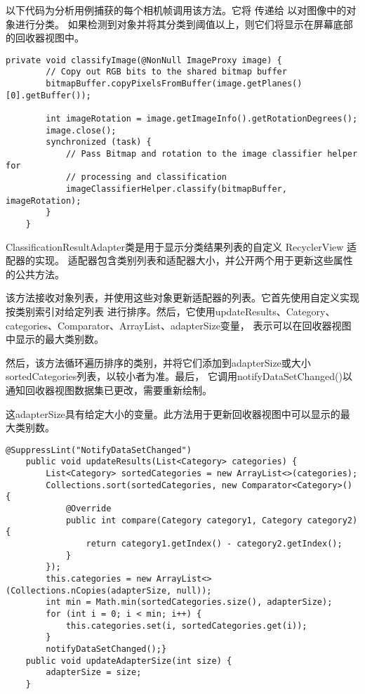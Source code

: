 以下代码为分析用例捕获的每个相机帧调用该方法。它将 传递给 以对图像中的对象进行分类。
如果检测到对象并将其分类到阈值以上，则它们将显示在屏幕底部的回收器视图中。
\begin{lstlisting}[style=code]
    private void classifyImage(@NonNull ImageProxy image) {
        // Copy out RGB bits to the shared bitmap buffer
        bitmapBuffer.copyPixelsFromBuffer(image.getPlanes()[0].getBuffer());

        int imageRotation = image.getImageInfo().getRotationDegrees();
        image.close();
        synchronized (task) {
            // Pass Bitmap and rotation to the image classifier helper for
            // processing and classification
            imageClassifierHelper.classify(bitmapBuffer, imageRotation);
        }
    }
\end{lstlisting}

ClassificationResultAdapter类是用于显示分类结果列表的自定义 RecyclerView 适配器的实现。
适配器包含类别列表和适配器大小，并公开两个用于更新这些属性的公共方法。

该方法接收对象列表，并使用这些对象更新适配器的列表。它首先使用自定义实现按类别索引对给定列表
进行排序。然后，它使用updateResults、Category、categories、Comparator、ArrayList、adapterSize变量，
表示可以在回收器视图中显示的最大类别数。

然后，该方法循环遍历排序的类别，并将它们添加到adapterSize或大小sortedCategories列表，以较小者为准。最后，
它调用notifyDataSetChanged()以通知回收器视图数据集已更改，需要重新绘制。

这adapterSize具有给定大小的变量。此方法用于更新回收器视图中可以显示的最大类别数。
\begin{lstlisting}[style=code]
    @SuppressLint("NotifyDataSetChanged")
    public void updateResults(List<Category> categories) {
        List<Category> sortedCategories = new ArrayList<>(categories);
        Collections.sort(sortedCategories, new Comparator<Category>() {
            @Override
            public int compare(Category category1, Category category2) {
                return category1.getIndex() - category2.getIndex();
            }
        });
        this.categories = new ArrayList<>(Collections.nCopies(adapterSize, null));
        int min = Math.min(sortedCategories.size(), adapterSize);
        for (int i = 0; i < min; i++) {
            this.categories.set(i, sortedCategories.get(i));
        }
        notifyDataSetChanged();}
    public void updateAdapterSize(int size) {
        adapterSize = size;
    }

\end{lstlisting}

